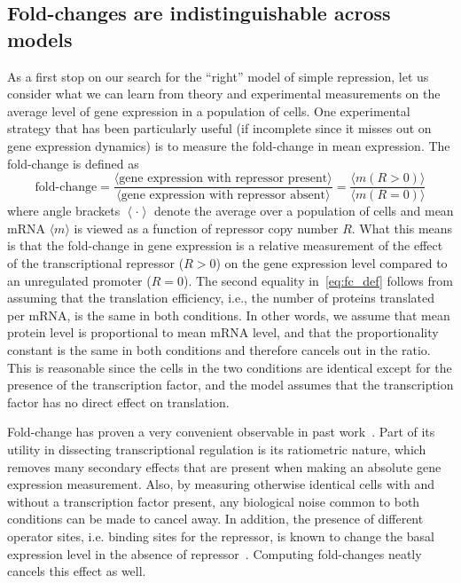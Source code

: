\subsection{Fold-changes are indistinguishable across models}
As a first stop on our search for the ``right'' model of simple repression, let
us consider what we can learn from theory and experimental measurements on the
average level of gene expression in a population of cells. One experimental
strategy that has been particularly useful (if incomplete since it misses out on
gene expression dynamics) is to measure the fold-change in mean expression. The
fold-change is defined as
\begin{equation}
\text{fold-change}
= \frac{\langle \text{gene expression with repressor present} \rangle}
        {\langle \text{gene expression with repressor absent} \rangle}
= \frac{\langle m (R > 0) \rangle}{\langle m (R = 0) \rangle}
\label{eq:fc_def}
\end{equation}
where angle brackets $\left\langle \cdot \right\rangle$ denote the average over
a population of cells and mean mRNA $\langle m\rangle$ is viewed as a function
of repressor copy number $R$. What this means is that the fold-change in gene
expression is a relative measurement of the effect of the transcriptional 
repressor ($R > 0$) on the gene expression level compared to an unregulated
promoter ($R = 0$). The second equality in~\ref{eq:fc_def} follows from assuming
that the translation efficiency, i.e., the number of proteins translated per
mRNA, is the same in both conditions. In other words, we assume that mean
protein level is proportional to mean mRNA level, and that the proportionality
constant is the same in both conditions and therefore cancels out in the ratio.
This is reasonable since the cells in the two conditions are identical except
for the presence of the transcription factor, and the model assumes that the
transcription factor has no direct effect on translation.

Fold-change has proven a very convenient observable in past
work~\cite{Garcia2011a, Razo-Mejia2018, Chure2019}. Part of its utility in
dissecting transcriptional regulation is its ratiometric nature, which removes
many secondary effects that are present when making an absolute gene expression
measurement. Also, by measuring otherwise identical cells with and without a
transcription factor present, any biological noise common to both conditions can
be made to cancel away. In addition, the presence of different operator sites,
i.e. binding sites for the repressor, is known to change the basal expression
level in the absence of repressor~. Computing fold-changes neatly cancels this
effect as well.


